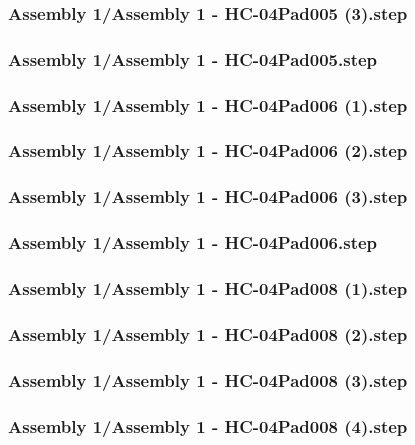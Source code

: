 \documentclass[a4paper,12pt]{article}
\begin{document}
\begin{lstlising}[language=C++]
\subsubsection{Assembly 1/Assembly 1 - HC-04Pad005 (3).step}

\subsubsection{Assembly 1/Assembly 1 - HC-04Pad005.step}

\subsubsection{Assembly 1/Assembly 1 - HC-04Pad006 (1).step}

\subsubsection{Assembly 1/Assembly 1 - HC-04Pad006 (2).step}

\subsubsection{Assembly 1/Assembly 1 - HC-04Pad006 (3).step}

\subsubsection{Assembly 1/Assembly 1 - HC-04Pad006.step}

\subsubsection{Assembly 1/Assembly 1 - HC-04Pad008 (1).step}

\subsubsection{Assembly 1/Assembly 1 - HC-04Pad008 (2).step}

\subsubsection{Assembly 1/Assembly 1 - HC-04Pad008 (3).step}

\subsubsection{Assembly 1/Assembly 1 - HC-04Pad008 (4).step}


\end{lstlising}
\end{document}
